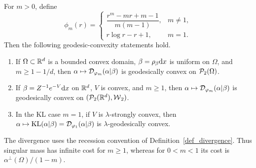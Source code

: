 \begin{prop}\label{prop-power-divergences-geodesic-convexity}\label{prop-kl-gibbs-geodesic-convexity}
For \(m>0\), define
\[
\phi_m(r)=
\begin{cases}
\dfrac{r^m-mr+m-1}{m(m-1)}, & m\neq1,\\[2mm]
r\log r-r+1, & m=1.
\end{cases}
\]
Then the following geodesic-convexity statements hold.
\begin{enumerate}
\item If \(\Omega\subset\mathbb{R}^d\) is a bounded convex domain, \(\beta=\rho_{\beta}\mathrm{d} x\) is uniform on \(\Omega\), and \(m\geq1-1/d\), then \(\alpha\mapsto\mathcal{D}_{\varphi_m}(\alpha|\beta)\) is geodesically convex on \(\mathcal{P}_2(\Omega)\).
\item If \(\beta=Z^{-1}e^{-V}\mathrm{d} x\) on \(\mathbb{R}^d\), \(V\) is convex, and \(m\geq1\), then \(\alpha\mapsto\mathcal{D}_{\varphi_m}(\alpha|\beta)\) is geodesically convex on \((\mathcal{P}_2(\mathbb{R}^d),\operatorname{\mathcal{W}}_2)\).
\item In the KL case \(m=1\), if \(V\) is \(\lambda\)-strongly convex, then \(\alpha\mapsto\operatorname{KL}(\alpha|\beta)=\mathcal{D}_{\varphi_1}(\alpha|\beta)\) is \(\lambda\)-geodesically convex.
\end{enumerate}
The divergence uses the recession convention of Definition~\ref{def_divergence}. Thus singular mass has infinite cost for \(m\geq1\), whereas for \(0<m<1\) its cost is \(\alpha^\perp(\Omega)/(1-m)\).
\end{prop}
